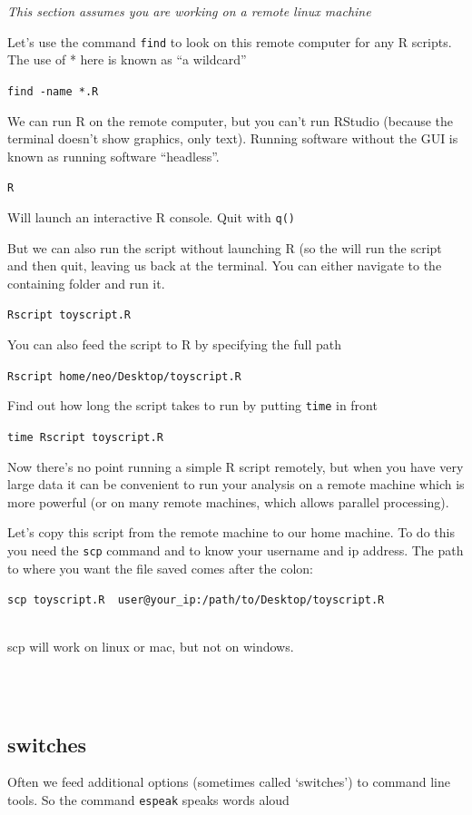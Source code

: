 \documentclass[
]{book}
\newenvironment{info}
    {
    \hline\\
    }
    { 
    \\\\\hline
    }
\begin{document}
\emph{This section assumes you are working on a remote linux machine}

Let's use the command \texttt{find} to look on this remote computer for any R scripts. The use of * here is known as ``a wildcard''

\texttt{find\ -name\ \textquotesingle{}*.R\textquotesingle{}}

We can run R on the remote computer, but you can't run RStudio (because the terminal doesn't show graphics, only text). Running software without the GUI is known as running software ``headless''.

\texttt{R}

Will launch an interactive R console. Quit with \texttt{q()}

But we can also run the script without launching R (so the will run the script and then quit, leaving us back at the terminal. You can either navigate to the containing folder and run it.

\texttt{Rscript\ toyscript.R}

You can also feed the script to R by specifying the full path

\texttt{Rscript\ home/neo/Desktop/toyscript.R}

Find out how long the script takes to run by putting \texttt{time} in front

\texttt{time\ Rscript\ toyscript.R}

Now there's no point running a simple R script remotely, but when you have very large data it can be convenient to run your analysis on a remote machine which is more powerful (or on many remote machines, which allows parallel processing).

Let's copy this script from the remote machine to our home machine. To do this you need the \texttt{scp} command and to know your username and ip address. The path to where you want the file saved comes after the colon:

\texttt{scp\ toyscript.R\ \ user@your\_ip:/path/to/Desktop/toyscript.R}

\begin{info}
scp will work on linux or mac, but not on windows.
\end{info}

\hypertarget{switches}{%
\subsection{switches}\label{switches}}

Often we feed additional options (sometimes called `switches') to command line tools. So the command \texttt{espeak} speaks words aloud
\end{document}
